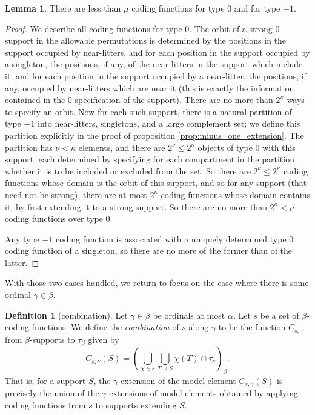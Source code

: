 \documentclass{article}
\theoremstyle{definition}
\newtheorem{lemma}[theorem]{Lemma}
\newtheorem{definition}[theorem]{Definition}
\theoremstyle{remark}
\begin{document}
{\begin{lemma}\label{lem:count_coding_function_zero}
There are less than $\mu$ coding functions for type 0 and for type $-1$.
\end{lemma}
\begin{proof}
We describe all coding functions for type 0.  The orbit of a strong 0-support in the allowable permutations is determined by the positions in the support  occupied by near-litters, and for each position in the support occupied by a singleton, the positions, if any, of the near-litters in the support  which include it, and for each position in the support occupied by a near-litter, the positions, if any, occupied by near-litters which are near it (this is exactly the information contained in the 0-specification of the support).
There are no more than $2^\kappa$ ways to specify an orbit.  Now for each such support, there is a natural partition of type $-1$ into near-litters, singletons, and a large complement set; we define this partition explicitly in the proof of proposition \ref{prop:minus_one_extension}.
The partition has $\nu<\kappa$ elements, and there are $2^\nu\leq 2^\kappa$ objects of type 0 with this support, each determined by specifying for each compartment in the partition whether it is to be included or excluded from the set.
So there are $2^\nu\leq 2^\kappa$ coding functions whose domain is the orbit of this support, and so for any support (that need not be strong), there are at most $2^\kappa$ coding functions whose domain contains it, by first extending it to a strong support.   So there are no more than $2^\kappa<\mu$ coding functions over type 0.

Any type $-1$ coding function is associated with a uniquely determined type 0 coding function of a singleton, so there are no more of the former than of the latter.
\end{proof}

With those two cases handled, we return to focus on the case where there is some ordinal $\gamma \in \beta$.

\begin{definition}[combination]\label{def:combination}
Let $\gamma \in \beta$ be ordinals at most $\alpha$.
Let $s$ be a set of $\beta$-coding functions.
We define the {\em combination\/} of $s$ along $\gamma$ to be the function $C_{s,\gamma}$ from $\beta$-supports to $\tau_\beta$ given by
$$ C_{s,\gamma}(S) = \left( \bigcup_{\chi \in s} \bigcup_{T \supseteq S} \chi(T) \cap \tau_\gamma \right)_\beta. $$
That is, for a support $S$, the $\gamma$-extension of the model element $C_{s,\gamma}(S)$ is precisely the union of the $\gamma$-extensions of model elements obtained by applying coding functions from $s$ to supports extending $S$.


\end{definition}}
\end{document}

